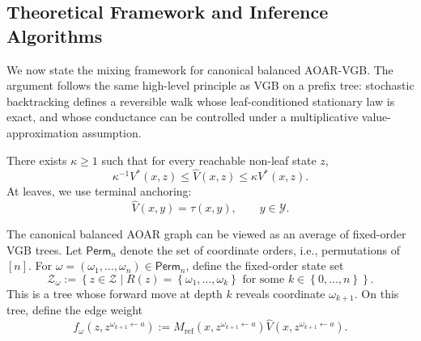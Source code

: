 \documentclass{article}
\numberwithin{theorem}{section}
\numberwithin{proposition}{section}
\numberwithin{corollary}{section}
\numberwithin{lemma}{section}
\numberwithin{conjecture}{section}
\numberwithin{remark}{section}
\numberwithin{definition}{section}
\numberwithin{assumption}{section}
\numberwithin{example}{section}
\newcommand{\calY}{{\mathcal{Y}}}
\newcommand{\calZ}{{\mathcal{Z}}}
\newcommand{\mbra}[1]{\left\{#1\right\}}
\begin{document}
\subsection{Theoretical Framework and Inference Algorithms}
\label{app:subsec:aoar_theory_algorithms}

We now state the mixing framework for canonical balanced AOAR-VGB. The argument follows the same high-level principle as VGB on a prefix tree: stochastic backtracking defines a reversible walk whose leaf-conditioned stationary law is exact, and whose conductance can be controlled under a multiplicative value-approximation assumption.

\begin{assumption}
\label{ass:aoar_kappa_accuracy}
There exists $\kappa\ge 1$ such that for every reachable non-leaf state $z$,
\begin{equation*}
    \kappa^{-1}V^*(x,z)\le \widehat V(x,z)\le \kappa V^*(x,z).
\end{equation*}
At leaves, we use terminal anchoring:
\begin{equation*}
\label{eq:terminal_anchoring}
    \widehat V(x,y)=\tau(x,y), \qquad y\in\calY.
\end{equation*}
\end{assumption}

The canonical balanced AOAR graph can be viewed as an average of fixed-order VGB trees. Let $\mathsf{Perm}_n$ denote the set of coordinate orders, i.e., permutations of $[n]$. For $\omega=(\omega_1,\dots,\omega_n)\in\mathsf{Perm}_n$, define the fixed-order state set
\begin{equation*}
    \calZ_\omega := \mbra{ z\in\calZ \mid R(z)=\mbra{\omega_1,\dots,\omega_k} \text{ for some } k\in\mbra{0,\dots,n} }.
\end{equation*}
This is a tree whose forward move at depth $k$ reveals coordinate $\omega_{k+1}$. On this tree, define the edge weight
\begin{equation*}
    f_\omega(z,z^{\omega_{k+1}\leftarrow a}) := M_{\text{ref}}(x,z^{\omega_{k+1}\leftarrow a}) \widehat V(x,z^{\omega_{k+1}\leftarrow a}).
\end{equation*}
\end{document}
